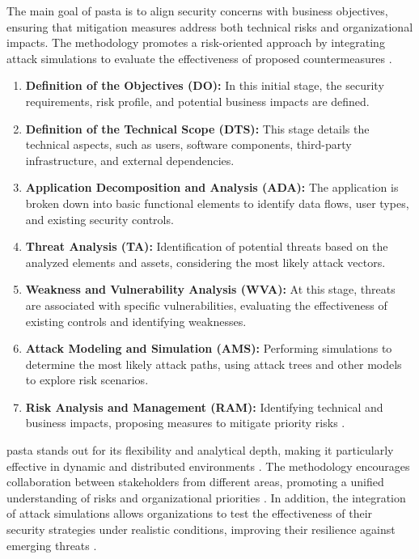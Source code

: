 The main goal of \gls{pasta} is to align security concerns with business
objectives, ensuring that mitigation measures address both technical risks and
organizational impacts. The methodology promotes a risk-oriented approach by
integrating attack simulations to evaluate the effectiveness of proposed
countermeasures \cite{RiskCentricThreatModeling}.

\begin{enumerate}
    \item \textbf{Definition of the Objectives (DO):} In this initial
stage, the security requirements, risk profile, and potential
business impacts are defined.
    \item \textbf{Definition of the Technical Scope (DTS):} This stage
details the technical aspects, such as users, software components,
third-party infrastructure, and external dependencies.
    \item \textbf{Application Decomposition and Analysis (ADA):} The
application is broken down into basic functional elements to identify
data flows, user types, and existing security controls.
    \item \textbf{Threat Analysis (TA):} Identification of potential
threats based on the analyzed elements and assets, considering the most
likely attack vectors.
    \item \textbf{Weakness and Vulnerability Analysis (WVA):} At this
stage, threats are associated with specific vulnerabilities,
evaluating the effectiveness of existing controls and identifying
weaknesses.
    \item \textbf{Attack Modeling and Simulation (AMS):} Performing
simulations to determine the most likely attack paths,
using attack trees and other models to explore risk
scenarios.
    \item \textbf{Risk Analysis and Management (RAM):} Identifying
technical and business impacts, proposing measures to mitigate
priority risks \cite{RiskCentricThreatModeling}.
\end{enumerate}

\gls{pasta} stands out for its flexibility and analytical depth, making it
particularly effective in dynamic and distributed environments
\cite{ThreatModelingASystematicLiteratureReview}. The methodology encourages
collaboration between stakeholders from different areas, promoting a unified
understanding of risks and organizational priorities
\cite{ParticipatoryThreatModelling}. In addition, the integration of attack
simulations allows organizations to test the effectiveness of their security
strategies under realistic conditions, improving their resilience against
emerging threats \cite{RiskCentricThreatModeling}.

